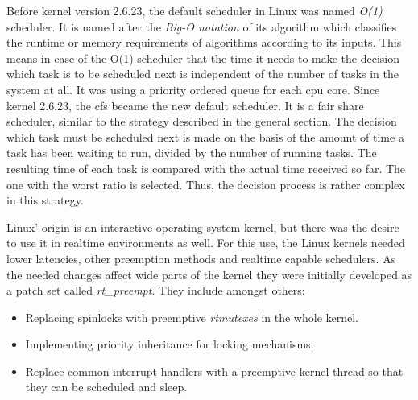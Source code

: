 Before kernel version 2.6.23, the default scheduler in Linux was named \textit{O(1)} scheduler. 
It is named after the \textit{Big-O notation} of its algorithm which classifies the runtime or memory requirements of algorithms according to its inputs.
This means in case of the O(1) scheduler that the time it needs to make the decision which task is to be scheduled next is independent of the number of tasks in the system at all.
It was using a priority ordered queue for each \ac{cpu} core\cite{lfd430}.
Since kernel 2.6.23, the \ac{cfs} became the new default scheduler.
It is a fair share scheduler, similar to the strategy described in the general section.
The decision which task must be scheduled next is made on the basis of the amount of time a task has been waiting to run, divided by the number of running tasks.
The resulting time of each task is compared with the actual time received so far.
The one with the worst ratio is selected.
Thus, the decision process is rather complex in this strategy\cite{lfd430}.

Linux' origin is an interactive operating system kernel, but there was the desire to use it in realtime environments as well. 
For this use, the Linux kernels needed lower latencies, other preemption methods and realtime capable schedulers.
As the needed changes affect wide parts of the kernel they were initially developed as a patch set called \textit{rt\_preempt}.
They include amongst others:
\begin{itemize}
    \item Replacing spinlocks with preemptive \textit{rtmutexes} in the whole kernel.
    \item Implementing priority inheritance for locking mechanisms.
    \item Replace common interrupt handlers with a preemptive kernel thread so that they can be scheduled and sleep\cite{lfd430}.
\end{itemize}

